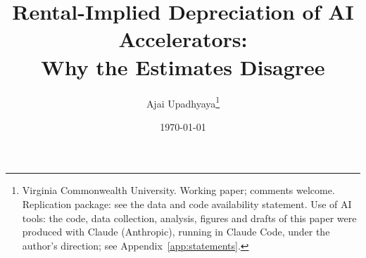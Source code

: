 \documentclass[11pt]{article}
\title{Rental-Implied Depreciation of AI Accelerators:\\ Why the Estimates Disagree}
\author{Ajai Upadhyaya\thanks{Virginia Commonwealth University. Working paper;
comments welcome. Replication package: see the data and code availability statement. Use of AI
tools: the code, data collection, analysis, figures and drafts of this paper were produced with
Claude (Anthropic), running in Claude Code, under the author's direction; see
Appendix~\ref{app:statements}.}}
\date{\today}
\begin{document}
\maketitle

\begin{abstract}

\end{abstract}













\appendix

\end{document}
